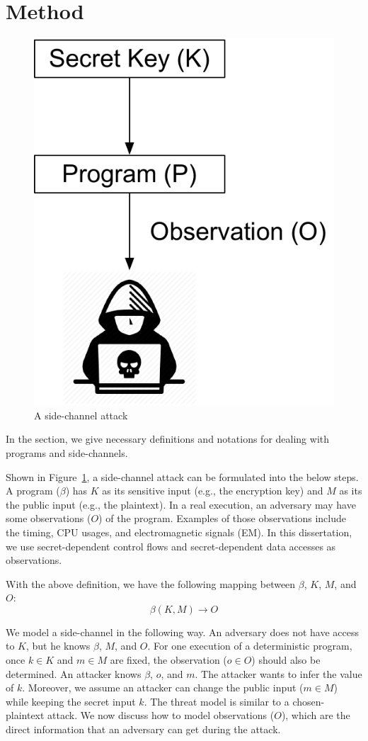 \section{Method}\label{chapter3:method}
\begin{figure}
    \centering
    \includegraphics[width=.3\columnwidth]{./figures/chapter3/attack.pdf}
    \caption{A side-channel attack}\label{fig:side-channel-attack}
\end{figure}

In the section, we give necessary definitions and notations for dealing with
programs and side-channels. 

Shown in Figure~\ref{fig:side-channel-attack}, a side-channel attack can be formulated into the below steps.  A program ($\beta$) has $K$ as its sensitive input (e.g., the encryption key) and $M$ as its the public input (e.g., the plaintext). In a real execution, an adversary may have 
some observations ($O$) of the program. Examples of those observations include the
timing, CPU usages, and electromagnetic signals (EM). In this dissertation, we 
use secret-dependent control flows and secret-dependent data 
accesses as observations. 

With the above definition, we have the following mapping between $\beta$,
$K$, $M$, and $O$:
\begin{displaymath}
    \beta(K, M) \rightarrow O
\end{displaymath}


We model a side-channel in the following way. An adversary does not have
access to $K$, but he knows $\beta$, $M$, and $O$. For one execution of a
deterministic program, once $k \in K$ and $m \in M$ are fixed, the observation
($o \in O$) should also be determined. An attacker knows $\beta$, $o$,
and $m$. The attacker wants to infer the value of $k$. Moreover, we assume
an attacker can change the public input ($m \in M$) while keeping the secret input $k$. 
The threat model is similar to a chosen-plaintext attack.
We now discuss how to model observations ($O$), 
which are the direct information that an adversary can get during the attack.

